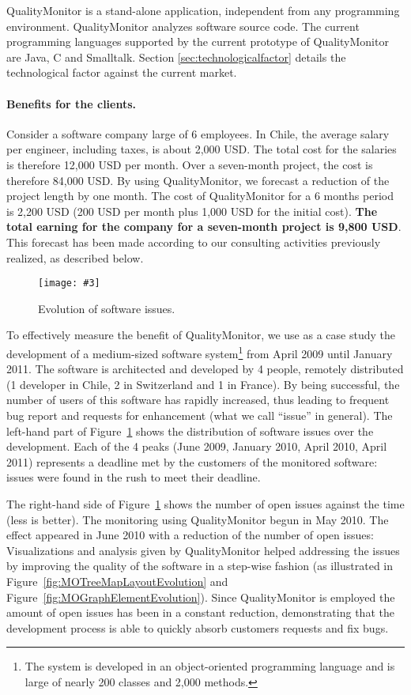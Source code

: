 \documentclass[runningheads]{llncs}
\newcommand{\fig}[4]{
	\begin{figure}[#1]
		\centering
		\texttt{[image: \#3]}
		\caption{\label{fig:#3}#4}
	\end{figure}}
\newcommand{\secref}[1]{Section \ref{sec:#1}}
\newcommand{\figref}[1]{Figure~\ref{fig:#1}}
\begin{document}
QualityMonitor is a stand-alone application, independent from any programming environment. QualityMonitor analyzes software source code. The current programming languages supported by the current prototype of QualityMonitor are Java, C and Smalltalk. \secref{technologicalfactor} details the technological factor against the current market.

\paragraph{Benefits for the clients.} Consider a software company large of 6 employees. In Chile, the average salary per engineer, including taxes, is about 2,000 USD. The total cost for the salaries is therefore 12,000 USD per month. Over a seven-month project, the cost is therefore 84,000 USD. By using QualityMonitor, we forecast a reduction of the project length by one month. The cost of QualityMonitor for a 6 months period is 2,200 USD (200 USD per month plus 1,000 USD for the initial cost). \textbf{The total earning for the company for a seven-month project is 9,800 USD}. This forecast has been made according to our consulting activities previously realized, as described below.

\fig{}{1}{BugReductions}{Evolution of software issues.}

To effectively measure the benefit of QualityMonitor, we use as a case study the development of a medium-sized software system\footnote{The system is developed in an object-oriented programming language and is large of nearly 200 classes and 2,000 methods.} from April 2009 until January 2011. The software is architected and developed by 4 people, remotely distributed (1 developer in Chile, 2 in Switzerland and 1 in France). By being successful, the number of users of this software has rapidly increased, thus leading to frequent bug report and requests for enhancement (what we call ``issue'' in general). The left-hand part of \figref{BugReductions} shows the distribution of software issues over the development. Each of the 4 peaks (June 2009, January 2010, April 2010, April 2011) represents a deadline met by the customers of the monitored software: issues were found in the rush to meet their deadline. 

The right-hand side of \figref{BugReductions} shows the number of open issues against the time (less is better). The monitoring using QualityMonitor begun in May 2010. The effect appeared in June 2010 with a reduction of the number of open issues: Visualizations and analysis given by QualityMonitor helped addressing the issues by improving the quality of the software in a step-wise fashion (as illustrated in \figref{MOTreeMapLayoutEvolution} and \figref{MOGraphElementEvolution}). Since QualityMonitor is employed the amount of open issues has been in a constant reduction, demonstrating that the development process is able to quickly absorb customers requests and fix bugs.
\end{document}
